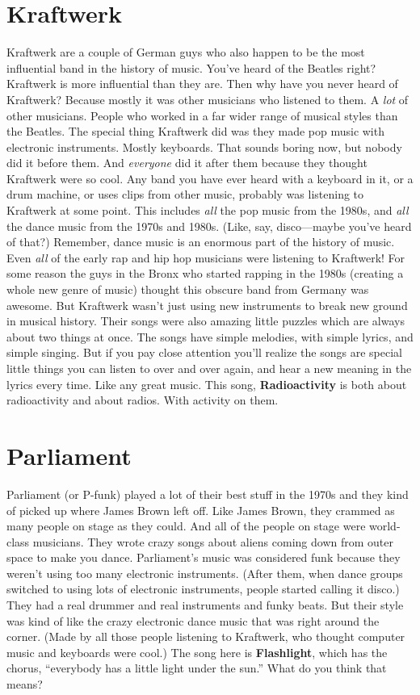 \documentclass[letterpaper,single]{article}
\begin{document}
\section{Kraftwerk}
Kraftwerk are a couple of German guys who also happen to be the most
influential band in the history of music. You've heard of the Beatles
right? Kraftwerk is more influential than they are. Then why have you
never heard of Kraftwerk? Because mostly it was other musicians who
listened to them. A \emph{lot} of other musicians. People who worked
in a far wider range of musical styles than the Beatles. The special
thing Kraftwerk did was they made pop music with electronic instruments.
Mostly keyboards. That sounds boring now, but nobody did it before them.
And \emph{everyone} did it after them because they thought Kraftwerk
were so cool. Any band you have ever heard with a keyboard in it, or a
drum machine, or uses clips from other music, probably was listening to
Kraftwerk at some point. This includes \emph{all} the pop music from the
1980s, and \emph{all} the dance music from the 1970s and 1980s. (Like,
say, disco---maybe you've heard of that?) Remember, dance music is an
enormous part of the history of music. Even \emph{all} of the early rap
and hip hop musicians were listening to Kraftwerk! For some reason the
guys in the Bronx who started rapping in the 1980s (creating a whole
new genre of music) thought this obscure band from Germany was awesome.
But Kraftwerk wasn't just using new instruments to break new ground in
musical history. Their songs were also amazing little puzzles which
are always about two things at once. The songs have simple melodies,
with simple lyrics, and simple singing. But if you pay close attention
you'll realize the songs are special little things you can listen to
over and over again, and hear a new meaning in the lyrics every time.
Like any great music. This song, \textbf{Radioactivity} is both about
radioactivity and about radios. With activity on them.

\section{Parliament}
Parliament (or P-funk) played a lot of their best stuff in the 1970s
and they kind of picked up where James Brown left off. Like James
Brown, they crammed as many people on stage as they could. And all
of the people on stage were world-class musicians. They wrote crazy
songs about aliens coming down from outer space to make you dance.
Parliament's music was considered funk because they weren't using too
many electronic instruments. (After them, when dance groups switched to
using lots of electronic instruments, people started calling it disco.)
They had a real drummer and real instruments and funky beats. But their
style was kind of like the crazy electronic dance music that was right
around the corner. (Made by all those people listening to Kraftwerk,
who thought computer music and keyboards were cool.) The song here is
\textbf{Flashlight}, which has the chorus, ``everybody has a little
light under the sun.'' What do you think that means?
\end{document}
